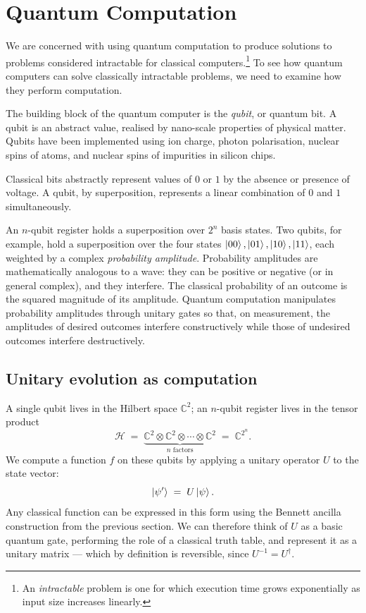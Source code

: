 \setcounter{equation}{0}
\section{Quantum Computation}

We are concerned with using quantum computation to produce solutions to problems considered intractable for classical computers.\footnote{An \emph{intractable} problem is one for which execution time grows exponentially as input size increases linearly.} To see how quantum computers can solve classically intractable problems, we need to examine how they perform computation.

The building block of the quantum computer is the \emph{qubit}, or quantum bit. A qubit is an abstract value, realised by nano-scale properties of physical matter. Qubits have been implemented using ion charge, photon polarisation, nuclear spins of atoms, and nuclear spins of impurities in silicon chips.

Classical bits abstractly represent values of $0$ or $1$ by the absence or presence of voltage. A qubit, by superposition, represents a linear combination of $0$ and $1$ simultaneously.

An $n$-qubit register holds a superposition over $2^n$ basis states. Two qubits, for example, hold a superposition over the four states $\mathinner{|{00}\rangle},\mathinner{|{01}\rangle},\mathinner{|{10}\rangle},\mathinner{|{11}\rangle}$, each weighted by a complex \emph{probability amplitude}. Probability amplitudes are mathematically analogous to a wave: they can be positive or negative (or in general complex), and they interfere. The classical probability of an outcome is the squared magnitude of its amplitude. Quantum computation manipulates probability amplitudes through unitary gates so that, on measurement, the amplitudes of desired outcomes interfere constructively while those of undesired outcomes interfere destructively.

\subsection{Unitary evolution as computation}

A single qubit lives in the Hilbert space $\mathbb{C}^2$; an $n$-qubit register lives in the tensor product
\begin{equation}
\mathcal{H} \;=\; \underbrace{\mathbb{C}^2 \otimes \mathbb{C}^2 \otimes \cdots \otimes \mathbb{C}^2}_{n \text{ factors}} \;=\; \mathbb{C}^{2^n}.
\end{equation}
We compute a function $f$ on these qubits by applying a unitary operator $U$ to the state vector:
\begin{equation}
\mathinner{|{\psi'}\rangle} \;=\; U \mathinner{|{\psi}\rangle}.
\end{equation}
Any classical function can be expressed in this form using the Bennett ancilla construction from the previous section. We can therefore think of $U$ as a basic quantum gate, performing the role of a classical truth table, and represent it as a unitary matrix --- which by definition is reversible, since $U^{-1} = U^\dagger$.


